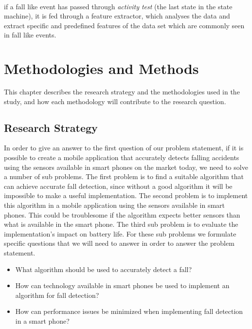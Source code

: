 \documentclass[12pt, a4paper, onecolumn]{article}
\begin{document}
	\paragraph{} if a fall like event has passed through \textit{activity test} (the last state in the state machine), it is fed through a feature extractor, which analyses the data and extract specific and predefined features of the data set which are commonly seen in fall like events. 
	
	\section{Methodologies and Methods}
	
	This chapter describes the research strategy and the methodologies used in the study, and how each methodology will contribute to the research question.
	
	\subsection{Research Strategy}
	
	In order to give an answer to the first question of our problem statement, if it is possible to create a mobile application that accurately detects falling accidents using the sensors available in smart phones on the market today, we need to solve a number of sub problems. The first problem is to find a suitable algorithm that can achieve accurate fall detection, since without a good algorithm it will be impossible to make a useful implementation. The second problem is to implement this algorithm in a mobile application using the sensors available in smart phones. This could be troublesome if the algorithm expects better sensors than what is available in the smart phone. The third sub problem is to evaluate the implementation's impact on battery life. For these sub problems we formulate specific questions that we will need to answer in order to answer the problem statement.
	
	\begin{itemize}
		\item What algorithm should be used to accurately detect a fall?
		\item How can technology available in smart phones be used to implement an algorithm for fall detection?
		\item How can performance issues be minimized when implementing fall detection in a smart phone?
	\end{itemize}
	
\end{document}
